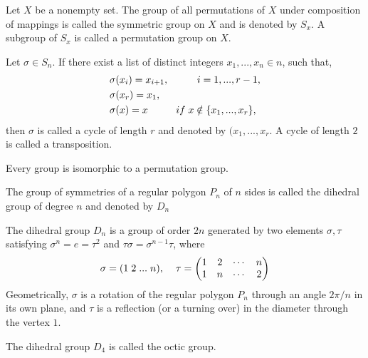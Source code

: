 \begin{defi}
Let $X$ be a nonempty set. The group of all permutations of $X$ under composition of mappings is called the symmetric group on $X$ and is denoted by $S_x$. A subgroup of $S_x$ is called a permutation group on $X$.
\end{defi}
\begin{defi}
    Let $\sigma\in S_n$. If there exist a list of distinct integers $x_1,...,x_n\in n$, such that,
    \begin{align*}
        &\sigma(x_i)=x_{i+1}, \hspace{1cm} i=1,...,r-1,\\
        &\sigma(x_r)=x_1,\\
        &\sigma(x)=x\hspace{1cm}if\hspace{.1cm}x\notin\{x_1,...,x_r\},
    \end{align*}
    then $\sigma$ is called a cycle of length $r$ and denoted by $(x_1,...,x_r$. A cycle of length $2$ is called a transposition.
\end{defi}
\begin{teo}
    Every group is isomorphic to a permutation group.
\end{teo}
\begin{defi}
    The group of symmetries of a regular polygon $P_n$ of $n$ sides is called the dihedral group of degree $n$ and denoted by $D_n$
\end{defi}
\begin{teo}
    The dihedral group $D_n$ is a group of order $2n$ generated by two elements $\sigma,\tau$ satisfying $\sigma^n=e=\tau^2$ and $\tau\sigma=\sigma^{n-1}\tau$, where
    \begin{equation*}
        \sigma=(1\hspace{.1cm}2\hspace{.1cm}...\hspace{.1cm}n),\hspace{.4cm}\tau=\begin{pmatrix}1&2&\cdots&n\\1&n&\cdots&2\end{pmatrix}
    \end{equation*}
    Geometrically, $\sigma$ is a rotation of the regular polygon $P_n$ through an angle $2\pi/n$ in its own plane, and $\tau$ is a reflection (or a turning over) in the diameter through the vertex $1$.
\end{teo}
\begin{defi}
    The dihedral group $D_4$ is called the octic group.
\end{defi}
